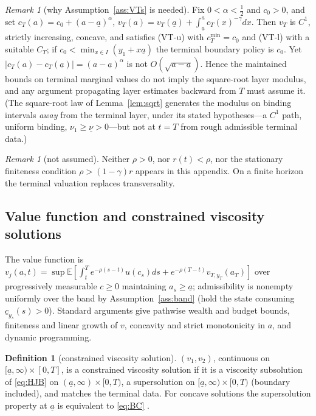 \documentclass[11pt]{article}
\theoremstyle{definition}
\newtheorem{definition}[theorem]{Definition}
\theoremstyle{remark}
\newtheorem{remark}[theorem]{Remark}
\newcommand{\ubar}[1]{\underline{#1}}
\newcommand{\E}{\mathbb{E}}
\newcommand{\ubc}{\ubar{c}}
\newcommand{\uba}{\ubar{a}}
\begin{document}
\begin{remark}[why Assumption~\ref{ass:VTs} is needed]
\label{rem:sqrtcounter}
Fix $0<\alpha<\tfrac12$ and $c_0>0$, and set
$c_T(a)=c_0+(a-\uba)^\alpha$,
$v_T(a)=v_T(\uba)+\int_{\uba}^a c_T(x)^{-\gamma}dx$. Then $v_T$ is
$C^1$, strictly increasing, concave, and satisfies (VT-u) with
$c_T^{\min}=c_0$ and (VT-l) with a suitable $C_T$; if
$c_0<\min_{x\in I}(y_1+x\uba)$ the terminal boundary policy is
$c_0$. Yet $|c_T(a)-c_T(\uba)|=(a-\uba)^\alpha$ is not
$O(\sqrt{a-\uba})$. Hence the maintained bounds on terminal marginal
values do not imply the square-root layer modulus, and any argument
propagating layer estimates backward from $T$ must assume it. (The
square-root law of Lemma~\ref{lem:sqrt} generates the modulus on
binding intervals \emph{away} from the terminal layer, under its
stated hypotheses---a $C^1$ path, uniform binding,
$\nu_1\ge\ubar\nu>0$---but not at $t=T$ from rough admissible
terminal data.)
\end{remark}

\begin{remark}[not assumed]
Neither $\rho>0$, nor $r(t)<\rho$, nor the stationary finiteness
condition $\rho>(1-\gamma)r$ appears in this appendix. On a finite
horizon the terminal valuation replaces transversality.
\end{remark}

\subsection{Value function and constrained viscosity solutions}

The value function is
$v_j(a,t)=\sup\E[\int_t^Te^{-\rho(s-t)}u(c_s)ds
+e^{-\rho(T-t)}v_{T,y_T}(a_T)]$ over progressively measurable
$c\ge0$ maintaining $a_s\ge\uba$; admissibility is nonempty uniformly
over the band by Assumption~\ref{ass:band} (hold the state consuming
$\ubc_{y_s}(s)>0$). Standard arguments give pathwise wealth and
budget bounds, finiteness and linear growth of $v$, concavity and
strict monotonicity in $a$, and dynamic programming.

\begin{definition}[constrained viscosity solution]\label{def:cvs}
$(v_1,v_2)$, continuous on $[\uba,\infty)\times[0,T]$, is a
constrained viscosity solution if it is a viscosity subsolution of
\eqref{eq:HJB} on $(\uba,\infty)\times[0,T)$, a supersolution on
$[\uba,\infty)\times[0,T)$ (boundary included), and matches the
terminal data. For concave solutions the supersolution property at
$\uba$ is equivalent to \eqref{eq:BC} \citep{Soner1986a,CDL1990}.
\end{definition}
\end{document}
